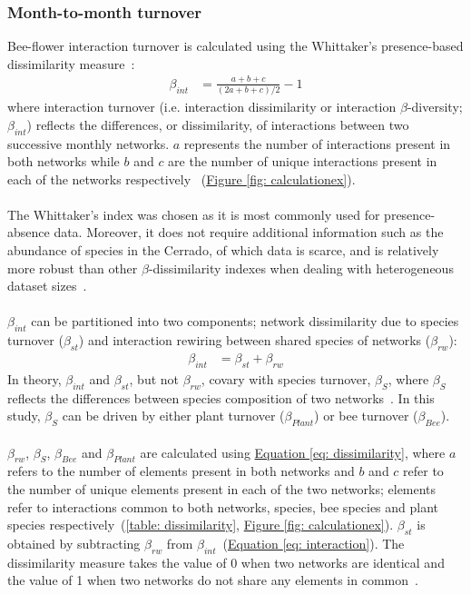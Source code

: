 \documentclass[11pt]{article}
\begin{document}
\subsubsection{Month-to-month turnover}
Bee-flower interaction turnover is calculated using the Whittaker's presence-based dissimilarity measure~\citep{Whittaker1960}: 
\begin{align}
	\beta_{int} & = \frac{a + b + c}{(2a + b + c)/2} - 1 
\label{eq: dissimilarity}
\end{align}
where interaction turnover (i.e. interaction dissimilarity or interaction $\beta$-diversity; $\beta_{int}$) reflects the differences, or dissimilarity, of interactions between two successive monthly networks. $a$ represents the number of interactions present in both networks while $b$ and $c$ are the number of unique interactions present in each of the networks respectively~\citep{Poisot2012} (\hyperref[fig: calculationex]{Figure \ref{fig: calculationex}}). \\
\\
The Whittaker's index was chosen as it is most commonly used for presence-absence data. Moreover, it does not require additional information such as the abundance of species in the Cerrado, of which data is scarce, and is relatively more robust than other $\beta$-dissimilarity indexes when dealing with heterogeneous dataset sizes~\citep{Koleff2003, Poisot2012}. \\
\\
$\beta_{int}$ can be partitioned into two components; network dissimilarity due to species turnover ($\beta_{st}$) and interaction rewiring between shared species of networks ($\beta_{rw}$):
\begin{align}
	\beta_{int} & = \beta_{st} + \beta_{rw} 
\label{eq: interaction}
\end{align}
In theory, $\beta_{int}$ and $\beta_{st}$, but not $\beta_{rw}$, covary with species turnover, $\beta_{S}$, where $\beta_{S}$ reflects the differences between species composition of two networks~\citep{Poisot2012}. In this study, $\beta_{S}$ can be driven by either plant turnover ($\beta_{Plant}$) or bee turnover ($\beta_{Bee}$). \\
\\
$\beta_{rw}$, $\beta_{S}$, $\beta_{Bee}$ and $\beta_{Plant}$ are calculated using \hyperref[eq: dissimilarity]{Equation \ref{eq: dissimilarity}}, where $a$ refers to the number of elements present in both networks and $b$ and $c$ refer to the number of unique elements present in each of the two networks; elements refer to interactions common to both networks, species, bee species and plant species respectively~(\autoref{table: dissimilarity}, \hyperref[fig: calculationex]{Figure \ref{fig: calculationex}}). $\beta_{st}$ is obtained by subtracting $\beta_{rw}$ from $\beta_{int}$~(\hyperref[eq: interaction]{Equation \ref{eq: interaction}}). The dissimilarity measure takes the value of 0 when two networks are identical and the value of 1 when two networks do not share any elements in common~\citep{Poisot2012, CaraDonna2017}. 
\end{document}
